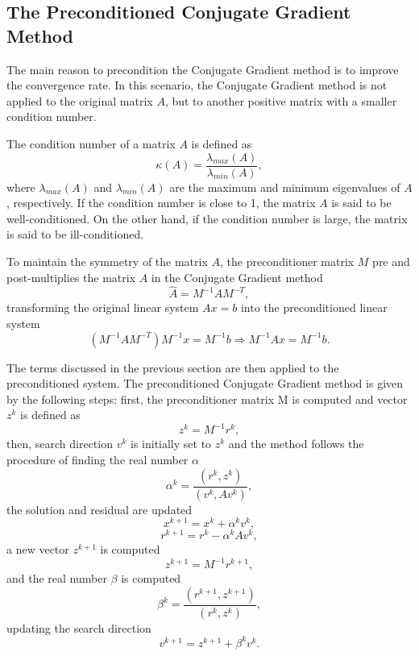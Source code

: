 \subsection{The Preconditioned Conjugate Gradient Method}
The main reason to precondition the Conjugate Gradient method is to improve the convergence rate. In this scenario, the Conjugate Gradient method is not applied to the original matrix $A$, but to another positive matrix with a smaller condition number. 

The condition number of a matrix $A$ is defined as
\begin{equation}
    \label{eq:condition_number}
    \kappa(A) = \frac{\lambda_{max}(A)}{\lambda_{min}(A)},
\end{equation}
where $\lambda_{max}(A)$ and $\lambda_{min}(A)$ are the maximum and minimum eigenvalues of $A$, respectively. If the condition number is close to 1, the matrix $A$ is said to be well-conditioned. On the other hand, if the condition number is large, the matrix is said to be ill-conditioned.

To maintain the symmetry of the matrix $A$, the preconditioner matrix $M$ pre and post-multiplies the matrix $A$ in the Conjugate Gradient method
\begin{equation}
    \hat{A} = M^{-1}AM^{-T},
\end{equation}
transforming the original linear system $Ax = b$ into the preconditioned linear system 
\begin{equation*}
    (M^{-1}AM^{-T})M^{-1}x = M^{-1}b \Rightarrow M^{-1}Ax = M^{-1}b. 
\end{equation*}

The terms discussed in the previous section are then applied to the preconditioned system. The preconditioned Conjugate Gradient method is given by the following steps: first, the preconditioner matrix M is computed and vector $z^k$ is defined as
\begin{equation}
    z^k = M^{-1}r^k,
\end{equation}
then, search direction $v^k$ is initially set to $z^k$ and the method follows the procedure of finding the real number $\alpha$
\begin{equation}
    \alpha^k = \frac{(r^k, z^k)}{(v^k, Av^k)},
\end{equation}
the solution and residual are updated
\begin{equation}
    x^{k+1} = x^k + \alpha^k v^k,
\end{equation}
\begin{equation}
    r^{k+1} = r^k - \alpha^k Av^k,
\end{equation}
a new vector $z^{k+1}$ is computed
\begin{equation}
    z^{k+1} = M^{-1}r^{k+1},
\end{equation}
and the real number $\beta$ is computed
\begin{equation}
    \beta^k = \frac{(r^{k+1}, z^{k+1})}{(r^k, z^k)},
\end{equation}
updating the search direction
\begin{equation}
    v^{k+1} = z^{k+1} + \beta^k v^k.
\end{equation}

